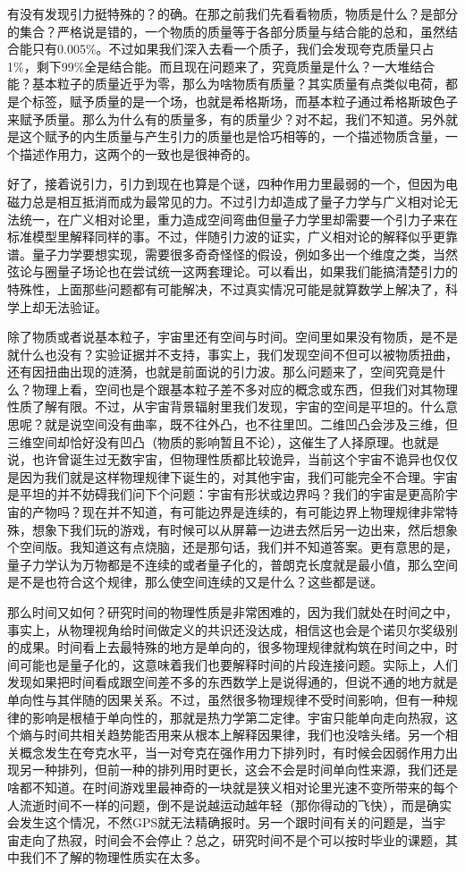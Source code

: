 \documentclass[]{book}
\begin{document}
有没有发现引力挺特殊的？的确。在那之前我们先看看物质，物质是什么？是部分的集合？严格说是错的，一个物质的质量等于各部分质量与结合能的总和，虽然结合能只有0.005\%。不过如果我们深入去看一个质子，我们会发现夸克质量只占1\%，剩下99\%全是结合能。而且现在问题来了，究竟质量是什么？一大堆结合能？基本粒子的质量近乎为零，那么为啥物质有质量？其实质量有点类似电荷，都是个标签，赋予质量的是一个场，也就是希格斯场，而基本粒子通过希格斯玻色子来赋予质量。那么为什么有的质量多，有的质量少？对不起，我们不知道。另外就是这个赋予的内生质量与产生引力的质量也是恰巧相等的，一个描述物质含量，一个描述作用力，这两个的一致也是很神奇的。

好了，接着说引力，引力到现在也算是个谜，四种作用力里最弱的一个，但因为电磁力总是相互抵消而成为最常见的力。不过引力却造成了量子力学与广义相对论无法统一，在广义相对论里，重力造成空间弯曲但量子力学里却需要一个引力子来在标准模型里解释同样的事。不过，伴随引力波的证实，广义相对论的解释似乎更靠谱。量子力学要想实现，需要很多奇奇怪怪的假设，例如多出一个维度之类，当然弦论与圈量子场论也在尝试统一这两套理论。可以看出，如果我们能搞清楚引力的特殊性，上面那些问题都有可能解决，不过真实情况可能是就算数学上解决了，科学上却无法验证。

除了物质或者说基本粒子，宇宙里还有空间与时间。空间里如果没有物质，是不是就什么也没有？实验证据并不支持，事实上，我们发现空间不但可以被物质扭曲，还有因扭曲出现的涟漪，也就是前面说的引力波。那么问题来了，空间究竟是什么？物理上看，空间也是个跟基本粒子差不多对应的概念或东西，但我们对其物理性质了解有限。不过，从宇宙背景辐射里我们发现，宇宙的空间是平坦的。什么意思呢？就是说空间没有曲率，既不往外凸，也不往里凹。二维凹凸会涉及三维，但三维空间却恰好没有凹凸（物质的影响暂且不论），这催生了人择原理。也就是说，也许曾诞生过无数宇宙，但物理性质都比较诡异，当前这个宇宙不诡异也仅仅是因为我们就是这样物理规律下诞生的，对其他宇宙，我们可能完全不合理。宇宙是平坦的并不妨碍我们问下个问题：宇宙有形状或边界吗？我们的宇宙是更高阶宇宙的产物吗？现在并不知道，有可能边界是连续的，有可能边界上物理规律非常特殊，想象下我们玩的游戏，有时候可以从屏幕一边进去然后另一边出来，然后想象个空间版。我知道这有点烧脑，还是那句话，我们并不知道答案。更有意思的是，量子力学认为万物都是不连续的或者量子化的，普朗克长度就是最小值，那么空间是不是也符合这个规律，那么使空间连续的又是什么？这些都是谜。

那么时间又如何？研究时间的物理性质是非常困难的，因为我们就处在时间之中，事实上，从物理视角给时间做定义的共识还没达成，相信这也会是个诺贝尔奖级别的成果。时间看上去最特殊的地方是单向的，很多物理规律就构筑在时间之中，时间可能也是量子化的，这意味着我们也要解释时间的片段连接问题。实际上，人们发现如果把时间看成跟空间差不多的东西数学上是说得通的，但说不通的地方就是单向性与其伴随的因果关系。不过，虽然很多物理规律不受时间影响，但有一种规律的影响是根植于单向性的，那就是热力学第二定律。宇宙只能单向走向热寂，这个熵与时间共相关趋势能否用来从根本上解释因果律，我们也没啥头绪。另一个相关概念发生在夸克水平，当一对夸克在强作用力下排列时，有时候会因弱作用力出现另一种排列，但前一种的排列用时更长，这会不会是时间单向性来源，我们还是啥都不知道。在时间游戏里最神奇的一块就是狭义相对论里光速不变所带来的每个人流逝时间不一样的问题，倒不是说越运动越年轻（那你得动的飞快），而是确实会发生这个情况，不然GPS就无法精确报时。另一个跟时间有关的问题是，当宇宙走向了热寂，时间会不会停止？总之，研究时间不是个可以按时毕业的课题，其中我们不了解的物理性质实在太多。
\end{document}
